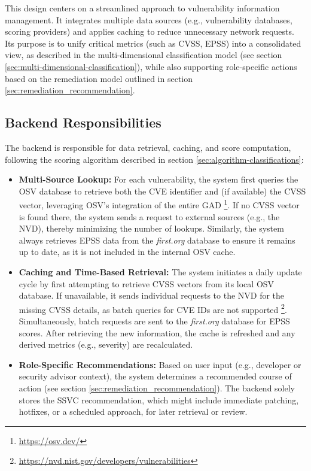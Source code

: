 This design centers on a streamlined approach to vulnerability information management. It integrates multiple data sources (e.g., vulnerability databases, scoring providers) and applies caching to reduce unnecessary network requests. Its purpose is to unify critical metrics (such as \ac{CVSS}, \ac{EPSS}) into a consolidated view, as described in the multi-dimensional classification model (see section \ref{sec:multi-dimensional-classification}), while also supporting role-specific actions based on the remediation model outlined in section \ref{sec:remediation_recommendation}.

\subsection{Backend Responsibilities}
\label{subsec:backend-responsibilities}

The backend is responsible for data retrieval, caching, and score computation, following the scoring algorithm described in section \ref{sec:algorithm-classifications}:
\begin{itemize}
    \item \textbf{Multi-Source Lookup:}  
    For each vulnerability, the system first queries the \ac{OSV} database to retrieve both the \ac{CVE} identifier and (if available) the \ac{CVSS} vector, leveraging \ac{OSV}'s integration of the entire \ac{GAD} \footnote{\url{https://osv.dev/}}. If no \ac{CVSS} vector is found there, the system sends a request to external sources (e.g., the \ac{NVD}), thereby minimizing the number of lookups. Similarly, the system always retrieves \ac{EPSS} data from the \textit{first.org} database to ensure it remains up to date, as it is not included in the internal \ac{OSV} cache.
    \item \textbf{Caching and Time-Based Retrieval:}  
    The system initiates a daily update cycle by first attempting to retrieve \ac{CVSS} vectors from its local \ac{OSV} database. If unavailable, it sends individual requests to the \ac{NVD} for the missing \ac{CVSS} details, as batch queries for \ac{CVE} IDs are not supported \footnote{\url{https://nvd.nist.gov/developers/vulnerabilities}}. Simultaneously, batch requests are sent to the \textit{first.org} database for \ac{EPSS} scores.
    After retrieving the new information, the cache is refreshed and any derived metrics (e.g., severity) are recalculated.
    \item \textbf{Role-Specific Recommendations:} Based on user input (e.g., developer or security advisor context), the system determines a recommended course of action (see section \ref{sec:remediation_recommendation}). The backend solely stores the \ac{SSVC} recommendation, which might include immediate patching, hotfixes, or a scheduled approach, for later retrieval or review.
\end{itemize}

